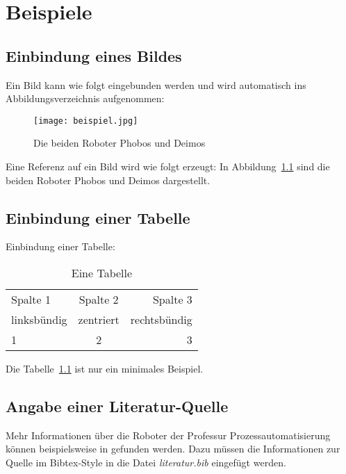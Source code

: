 \chapter{Beispiele}
\section{Einbindung eines Bildes}
Ein Bild kann wie folgt eingebunden werden und wird automatisch ins Abbildungsverzeichnis aufgenommen:

\begin{figure}[htb]
  \centering
  \texttt{[image: beispiel.jpg]}
  \caption{Die beiden Roboter Phobos und Deimos}
  \label{fig:roboter}
\end{figure}

Eine Referenz auf ein Bild wird wie folgt erzeugt: In Abbildung~\ref{fig:roboter} sind die beiden Roboter Phobos und Deimos dargestellt.

\section{Einbindung einer Tabelle}
Einbindung einer Tabelle:

\begin{table}[htb]
  \centering
  \begin{tabular}{l|c|r}
    Spalte 1 		& Spalte 2 	& Spalte 3 	\\
    linksbündig 	& zentriert 	& rechtsbündig 	\\
    1			& 2		& 3		\\
  \end{tabular}
  \caption{Eine Tabelle}
  \label{tab:table1}
\end{table}

Die Tabelle~\ref{tab:table1} ist nur ein minimales Beispiel.

\section{Angabe einer Literatur-Quelle}
Mehr Informationen über die Roboter der Professur Prozessautomatisierung können beispielsweise in \autocite{robots} gefunden werden. Dazu müssen die Informationen zur Quelle im Bibtex-Style in die Datei \textit{literatur.bib} eingefügt werden.



